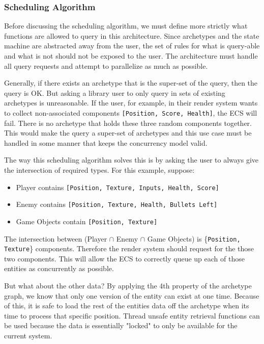 \subsubsection{Scheduling Algorithm}
Before discussing the scheduling algorithm, we must define more strictly what functions are allowed to query in this architecture. Since archetypes and the state machine are abstracted away from the user, the set of rules for what is query-able and what is not should not be exposed to the user. The architecture must handle all query requests and attempt to parallelize as much as possible. 

Generally, if there exists an archetype that is the super-set of the query, then the query is OK. But asking a library user to only query in sets of existing archetypes is unreasonable. If the user, for example, in their render system wants to collect non-associated components \texttt{[Position, Score, Health]}, the ECS will fail. There is no archetype that holds these three random components together. This would make the query a super-set of archetypes and this use case must be handled in some manner that keeps the concurrency model valid. 

The way this scheduling algorithm solves this is by asking the user to always give the intersection of required types. For this example, suppose:
\begin{itemize}
    \item Player contains \texttt{[Position, Texture, Inputs, Health, Score]}
    \item Enemy contains \texttt{[Position, Texture, Health, Bullets Left]}
    \item Game Objects contain \texttt{[Position, Texture]}
\end{itemize}

The intersection between (Player $\cap$ Enemy $\cap$ Game Objects) is \{\texttt{Position, Texture}\} components. Therefore the render system should request for the those two components. This will allow the ECS to correctly queue up each of those entities as concurrently as possible. 

But what about the other data? By applying the 4th property of the archetype graph, we know that only one version of the entity can exist at one time. Because of this, it is safe to load the rest of the entities data off the archetype when its time to process that specific position. Thread unsafe entity retrieval functions can be used because the data is essentially "locked" to only be available for the current system.

